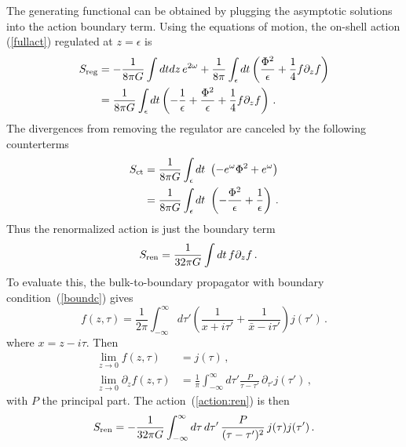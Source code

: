 \documentclass[12pt]{article}
\newcommand{\AAl}[1]{{\emph{\textcolor{blue}{#1}}}}
\newcommand{\OAAl}[1]{{\emph{\textcolor{blue}{\sout{#1}}}}}
\newcommand{\be}{\begin{equation}}
\newcommand{\ee}{\end{equation}}
\begin{document}
The generating functional can be obtained by plugging the asymptotic solutions into the action boundary term. Using the equations of motion, the on-shell action (\ref{fullact}) regulated at $z = \epsilon$ is
\begin{align}
S_{\rm reg} &= -{1 \over 8 \pi G} \int dt dz \,  e^{2 \omega} + {1 \over 8 \pi} \int_\epsilon dt \left(  {\Phi^2 \over \epsilon} + {1 \over 4} f \partial_z f  \right) \\
&= {1 \over 8 \pi G} \int_\epsilon dt \left( - {1 \over  \epsilon}  + {\Phi^2 \over \epsilon} + {1 \over 4} f \partial_z f  \right)  \,.
\end{align}
The divergences from removing the regulator are canceled by the following counterterms
\begin{align}
S_{\rm ct} &= {1 \over 8 \pi G}  \int_\epsilon dt \ \left( - e^{\omega} \Phi^2  +  e^{\omega}\right) \\
&= {1 \over 8 \pi G}  \int_\epsilon dt \ \left( - {\Phi^2 \over \epsilon}  + {1 \over \epsilon} \right)  \,.
\end{align}
Thus the renormalized action is just the boundary term
\begin{align}
S_{\rm ren} &= {1 \over 32 \pi G} \int dt \, f \partial_z f  \,. \label{action:ren}
\end{align}
To evaluate this, the bulk-to-boundary propagator with boundary condition~(\ref{boundc}) gives
\be
f(z, \tau) = \frac{1}{2\pi} \int_{-\infty}^\infty d\tau' \left(\frac{1}{x + i\tau'} + \frac{1}{\bar x - i\tau'} \right) j(\tau') \,.
\label{fbulk}
\ee
where $x = z - i\tau$.  Then 
\begin{align}
\lim_{z \to 0} f(z, \tau)  &= j(\tau) \,, \nonumber \\
\lim_{z \to 0} \partial_z f(z, \tau)  &= \frac{1}{\pi} \int_{-\infty}^\infty d\tau' \frac{ P}{\tau - \tau'}\, \partial_{\tau' } j(\tau') \,,\label{fdf}
\end{align}
with $P$ the principal part.  The action~(\ref{action:ren}) is then
\be
S_{\rm ren} = - {1 \over 32 \pi G} \int_{-\infty}^\infty  d\tau\, d\tau' \, \frac{ P}{(\tau - \tau')^2} \, j(\tau) j(\tau')  \,.
\ee
\end{document}
